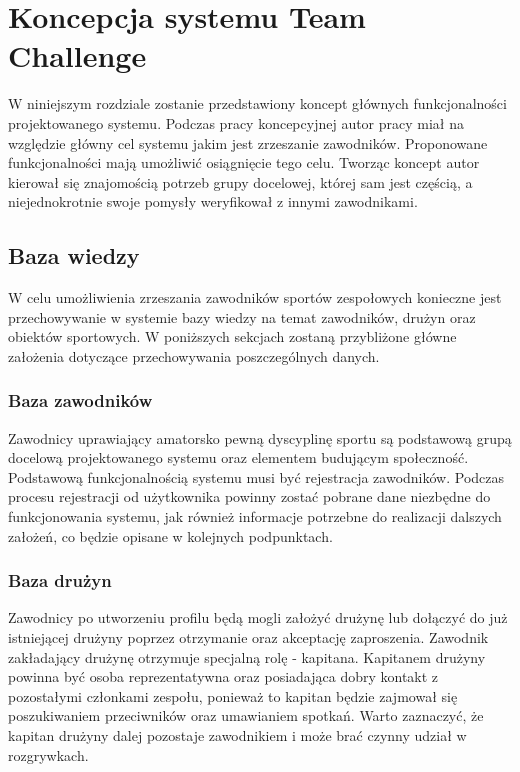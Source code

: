\chapter{Koncepcja systemu Team Challenge}

W niniejszym rozdziale zostanie przedstawiony koncept głównych funkcjonalności projektowanego systemu. Podczas pracy koncepcyjnej autor pracy miał na względzie główny cel systemu jakim jest zrzeszanie zawodników. Proponowane funkcjonalności mają umożliwić osiągnięcie tego celu. Tworząc koncept autor kierował się znajomością potrzeb grupy docelowej, której sam jest częścią, a niejednokrotnie swoje pomysły weryfikował z innymi zawodnikami.


  
\section{Baza wiedzy}

W celu umożliwienia zrzeszania zawodników sportów zespołowych konieczne jest przechowywanie w systemie bazy wiedzy na temat zawodników, drużyn oraz obiektów sportowych. W poniższych sekcjach zostaną przybliżone główne założenia dotyczące przechowywania poszczególnych danych.
  
\subsection{Baza zawodników}

Zawodnicy uprawiający amatorsko pewną dyscyplinę sportu są podstawową grupą docelową projektowanego systemu oraz elementem budującym społeczność. Podstawową funkcjonalnością systemu musi być rejestracja zawodników. Podczas procesu rejestracji od użytkownika powinny zostać pobrane dane niezbędne do funkcjonowania systemu, jak również informacje potrzebne do realizacji dalszych założeń, co będzie opisane w kolejnych podpunktach.

\subsection{Baza drużyn}

Zawodnicy po utworzeniu profilu będą mogli założyć drużynę lub dołączyć do już istniejącej drużyny poprzez otrzymanie oraz akceptację zaproszenia. Zawodnik zakładający drużynę otrzymuje specjalną rolę - kapitana. Kapitanem drużyny powinna być osoba reprezentatywna oraz posiadająca dobry kontakt z pozostałymi członkami zespołu, ponieważ to kapitan będzie zajmował się poszukiwaniem przeciwników oraz umawianiem spotkań. Warto zaznaczyć, że kapitan drużyny dalej pozostaje zawodnikiem i może brać czynny udział w rozgrywkach. 

